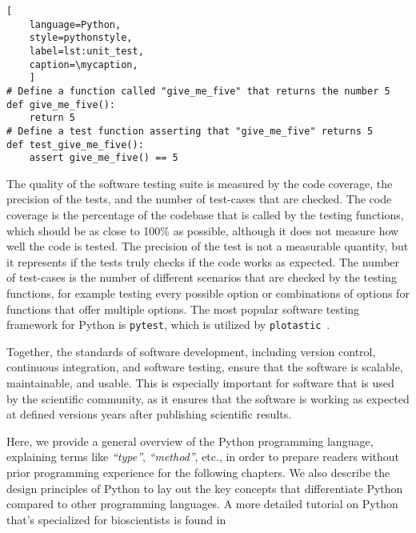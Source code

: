 \def\mycaption{ Example of an arbitrary Python function and its respective unit
    test function. The first function simply returns the number 5. The second
    function tests if the first function indeed returns the number 5. The test
    function is named with the prefix ``\texttt{test\_}'' and is placed in a
    file that ends with the suffix ``\texttt{\_test.py}''. The test function is
    executed by the testing framework \texttt{pytest}. Note that code after
    ``\texttt{\#}'' is considered a comment and won't be executed.}
\begin{lstlisting}[
    language=Python, 
    style=pythonstyle,
    label=lst:unit_test, 
    caption=\mycaption,
    ]
# Define a function called "give_me_five" that returns the number 5
def give_me_five():
    return 5
# Define a test function asserting that "give_me_five" returns 5
def test_give_me_five():
    assert give_me_five() == 5 
\end{lstlisting}

The quality of the software testing suite is measured by the code coverage, the
precision of the tests, and the number of test-cases that are checked. The code
coverage is the percentage of the codebase that is called by the testing
functions, which should be as close to 100\% as possible, although it does not
measure how well the code is tested. The precision of the test is not a
measurable quantity, but it represents if the tests truly checks if the code
works as expected. The number of test-cases is the number of different scenarios
that are checked by the testing functions, for example testing every possible
option or combinations of options for functions that offer multiple options. The
most popular software testing framework for Python is \texttt{pytest}, which is
utilized by \texttt{plotastic}~\cite{pytestx.y}.

Together, the standards of software development, including version control,
continuous integration, and software testing, ensure that the software is
scalable, maintainable, and usable. This is especially important for software
that is used by the scientific community, as it ensures that the software is
working as expected at defined versions years after publishing scientific
results.

%
\label{sec:intro_python}%
Here, we provide a general overview of the Python programming language,
explaining terms like \textit{``type''}, \textit{``method''}, etc., in order to
prepare readers without prior programming experience for the following chapters.
We also describe the design principles of Python to lay out the key concepts
that differentiate Python compared to other programming languages. A more
detailed tutorial on Python that's specialized for bioscientists is found
in~\citealt{ekmekciIntroductionProgrammingBioscientists2016}


